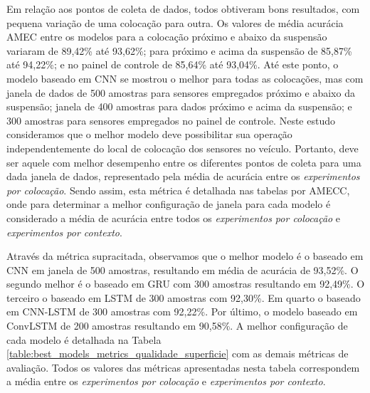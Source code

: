 Em relação aos pontos de coleta de dados, todos obtiveram bons resultados, com pequena variação de uma colocação para outra. Os valores de média acurácia AMEC entre os modelos para a colocação próximo e abaixo da suspensão variaram de 89,42\% até 93,62\%; para próximo e acima da suspensão de 85,87\% até 94,22\%; e no painel de controle de 85,64\% até 93,04\%. Até este ponto, o modelo baseado em CNN se mostrou o melhor para todas as colocações, mas com janela de dados de 500 amostras para sensores empregados próximo e abaixo da suspensão; janela de 400 amostras para dados próximo e acima da suspensão; e 300 amostras para sensores empregados no painel de controle. Neste estudo consideramos que o melhor modelo deve possibilitar sua operação independentemente do local de colocação dos sensores no veículo. Portanto, deve ser aquele com melhor desempenho entre os diferentes pontos de coleta para uma dada janela de dados, representado pela média de acurácia entre os \emph{experimentos por colocação}. Sendo assim, esta métrica é detalhada nas tabelas por AMECC, onde para determinar a melhor configuração de janela para cada modelo é considerado a média de acurácia entre todos os \emph{experimentos por colocação} e \emph{experimentos por contexto}.

Através da métrica supracitada, observamos que o melhor modelo é o baseado em CNN em janela de 500 amostras, resultando em média de acurácia de 93,52\%. O segundo melhor é o baseado em GRU com 300 amostras resultando em 92,49\%. O terceiro o baseado em LSTM de 300 amostras com 92,30\%. Em quarto o baseado em CNN-LSTM de 300 amostras com 92,22\%. Por último, o modelo baseado em ConvLSTM de 200 amostras resultando em 90,58\%. A melhor configuração de cada modelo é detalhada na Tabela \ref{table:best_models_metrics_qualidade_superficie} com as demais métricas de avaliação. Todos os valores das métricas apresentadas nesta tabela correspondem a média entre os \emph{experimentos por colocação} e \emph{experimentos por contexto}.

